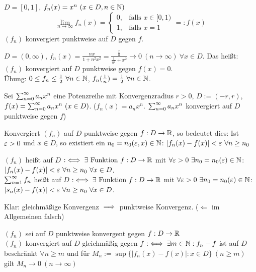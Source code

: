 \documentclass[a4paper,oneside,DIV15,BCOR12mm]{scrbook}
\begin{document}
\begin{beispiele}
\item $D=[0,1]$, $f_n(x) = x^n\ (x\in D, n\in\mathbb{N})$
$$ \lim_{n\to\infty} f_n(x) = \begin{cases} 0, & \text{falls }x\in[0,1) \\ 1, & \text{falls } x=1\end{cases} =: f(x) $$
$(f_n)$ konvergiert punktweise auf $D$ gegen $f$.

\item $D=(0,\infty)$, $f_n(x) = \frac{nx}{1+n^2x^2} = \frac{\frac{x}{n}}{\frac{1}{n^2} + x^2} \to 0 \ (n\to\infty)\ \forall x\in D$. Das heißt: $(f_n)$ konvergiert auf $D$ punktweise gegen $f(x)=0$. \\
Übung: $0\le f_n \le \frac{1}{2} \ \forall n\in\mathbb{N}$, $f_n(\frac{1}{n}) = \frac{1}{2} \ \forall n\in\mathbb{N}$.

\item Sei $\sum_{n=0}^{\infty}{a_nx^n}$ eine Potenzreihe mit Konvergenzradius $r>0$, $D:=(-r,r)$, $f(x) = \sum_{n=0}^{\infty}{a_nx^n} \ (x\in D)$. ($f_n(x) = a_nx^n$. $\sum_{n=0}^{\infty}{a_nx^n}$ konvergiert auf $D$ punktweise gegen $f$)
\end{beispiele}

Konvergiert $(f_n)$ auf $D$ punktweise gegen $f:D\to\mathbb{R}$, so bedeutet dies: Ist $\varepsilon>0$ und $x\in D$, so existiert ein $n_0 = n_0(\varepsilon,x)\in\mathbb{N}$: $|f_n(x)-f(x)|<\varepsilon \ \forall n\ge n_0$

\begin{definition}
$(f_n)$ heißt auf $D$  $:\iff \exists \text{ Funktion } f:D\to\mathbb{R}$ mit $\forall \ep>0 \ \exists n_0 = n_0(\ep) \in\MdN$: $|f_n(x) - f(x)|<\varepsilon \ \forall n\ge n_0 \ \forall x\in D$. \\
$\sum_{n=1}^{\infty}{f_n}$ heißt auf $D$  $:\iff \exists \text{ Funktion } f:D\to\mathbb{R}$ mit $\forall \ep>0 \ \exists n_0 = n_0(\ep) \in\MdN$: $|s_n(x) - f(x)|<\varepsilon \ \forall n\ge n_0 \ \forall x\in D$.
\end{definition}

Klar: gleichmäßige Konvergenz $\implies$ punktweise Konvergenz. ($\Leftarrow$ im Allgemeinen falsch)

\begin{bemerkung}
$(f_n)$ sei auf $D$ punktweise konvergent gegen $f:D\to \mathbb{R}$\\
$(f_n)$ konvergiert auf $D$ gleichmäßig gegen $f$ $:\iff \exists m\in\mathbb{N}: f_n - f$ ist auf $D$ beschränkt $\forall n\ge m$ und für $M_n := \sup\{|f_n(x) - f(x)|: x\in D\}\ (n\ge m)$ gilt $M_n \to 0\ (n\to\infty)$
\end{bemerkung}
\end{document}
